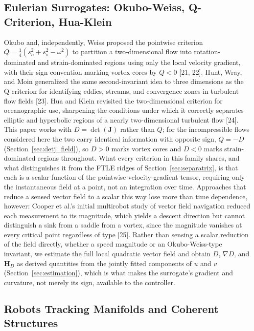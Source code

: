 \documentclass[lettersize,journal]{IEEEtran}
\begin{document}
\subsection{Eulerian Surrogates: Okubo-Weiss, Q-Criterion, Hua-Klein}

Okubo and, independently, Weiss proposed the pointwise criterion
$Q = \tfrac{1}{4}(s_n^2 + s_s^2 - \omega^2)$ to partition a two-dimensional
flow into rotation-dominated and strain-dominated regions using only the
local velocity gradient, with their sign convention marking vortex cores by
$Q < 0$ [21, 22]. Hunt, Wray, and Moin generalized the same second-invariant
idea to three dimensions as the Q-criterion for identifying eddies, streams,
and convergence zones in turbulent flow fields [23]. Hua and Klein revisited
the two-dimensional criterion for oceanographic use, sharpening the
conditions under which it correctly separates elliptic and hyperbolic
regions of a nearly two-dimensional turbulent flow [24]. This paper works
with $D = \det(\mathbf{J})$ rather than $Q$; for the incompressible flows
considered here the two carry identical information with opposite sign,
$Q = -D$ (Section~\ref{sec:detj_field}), so $D > 0$ marks vortex cores and
$D < 0$ marks strain-dominated regions throughout. What every criterion in
this family shares, and what distinguishes it from the FTLE ridges of
Section~\ref{sec:separatrix}, is that each is a scalar function of the
pointwise velocity-gradient tensor, requiring only the instantaneous field
at a point, not an integration over time. Approaches that reduce a sensed
vector field to a scalar this way lose more than time dependence, however:
Cooper et al.'s initial multirobot study of vector field navigation reduced
each measurement to its magnitude, which yields a descent direction but
cannot distinguish a sink from a saddle from a vortex, since the magnitude
vanishes at every critical point regardless of type [25]. Rather than
sensing a scalar reduction of the field directly, whether a speed magnitude
or an Okubo-Weiss-type invariant, we estimate the full local quadratic
vector field and obtain $D$, $\nabla D$, and $\mathbf{H}_D$ as derived
quantities from the jointly fitted components of $u$ and $v$
(Section~\ref{sec:estimation}), which is what makes the surrogate's
gradient and curvature, not merely its sign, available to the controller.

\subsection{Robots Tracking Manifolds and Coherent Structures}
\end{document}
